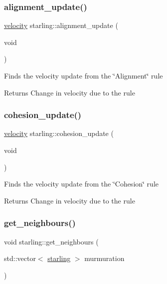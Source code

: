 \subsubsection{\texorpdfstring{alignment\+\_\+update()}{alignment\_update()}}
{\footnotesize\ttfamily \mbox{\hyperlink{classvelocity}{velocity}} starling\+::alignment\+\_\+update (\begin{DoxyParamCaption}\item[{void}]{ }\end{DoxyParamCaption})}

Finds the velocity update from the \char`\"{}\+Alignment\char`\"{} rule \begin{DoxyReturn}{Returns}
Change in velocity due to the rule 
\end{DoxyReturn}
\mbox{\label{classstarling_a9979a7817ef2663a2cf87de308d1f223}} 
\subsubsection{\texorpdfstring{cohesion\+\_\+update()}{cohesion\_update()}}
{\footnotesize\ttfamily \mbox{\hyperlink{classvelocity}{velocity}} starling\+::cohesion\+\_\+update (\begin{DoxyParamCaption}\item[{void}]{ }\end{DoxyParamCaption})}

Finds the velocity update from the \char`\"{}\+Cohesion\char`\"{} rule \begin{DoxyReturn}{Returns}
Change in velocity due to the rule 
\end{DoxyReturn}
\mbox{\label{classstarling_aa0e07efe70a471582f609524db1ac8af}} 
\subsubsection{\texorpdfstring{get\+\_\+neighbours()}{get\_neighbours()}}
{\footnotesize\ttfamily void starling\+::get\+\_\+neighbours (\begin{DoxyParamCaption}\item[{std\+::vector$<$ \mbox{\hyperlink{classstarling}{starling}} $>$}]{murmuration }\end{DoxyParamCaption})}

